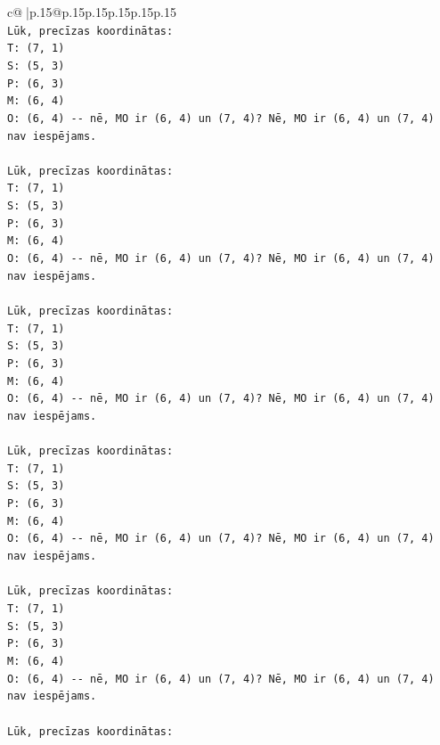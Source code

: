\documentclass{article}
\begin{document}
{\begin{supertabular}{c@{$\;$}|p{.15\linewidth}@{}p{.15\linewidth}p{.15\linewidth}p{.15\linewidth}p{.15\linewidth}p{.15\linewidth}}
{{{\\ 
\texttt{Lūk, precīzas koordinātas:} \\
\texttt{T: (7, 1)} \\
\texttt{S: (5, 3)} \\
\texttt{P: (6, 3)} \\
\texttt{M: (6, 4)} \\
\texttt{O: (6, 4) {-}{-} nē, MO ir (6, 4) un (7, 4)? Nē, MO ir (6, 4) un (7, 4) nav iespējams.} \\
\\ 
\texttt{Lūk, precīzas koordinātas:} \\
\texttt{T: (7, 1)} \\
\texttt{S: (5, 3)} \\
\texttt{P: (6, 3)} \\
\texttt{M: (6, 4)} \\
\texttt{O: (6, 4) {-}{-} nē, MO ir (6, 4) un (7, 4)? Nē, MO ir (6, 4) un (7, 4) nav iespējams.} \\
\\ 
\texttt{Lūk, precīzas koordinātas:} \\
\texttt{T: (7, 1)} \\
\texttt{S: (5, 3)} \\
\texttt{P: (6, 3)} \\
\texttt{M: (6, 4)} \\
\texttt{O: (6, 4) {-}{-} nē, MO ir (6, 4) un (7, 4)? Nē, MO ir (6, 4) un (7, 4) nav iespējams.} \\
\\ 
\texttt{Lūk, precīzas koordinātas:} \\
\texttt{T: (7, 1)} \\
\texttt{S: (5, 3)} \\
\texttt{P: (6, 3)} \\
\texttt{M: (6, 4)} \\
\texttt{O: (6, 4) {-}{-} nē, MO ir (6, 4) un (7, 4)? Nē, MO ir (6, 4) un (7, 4) nav iespējams.} \\
\\ 
\texttt{Lūk, precīzas koordinātas:} \\
\texttt{T: (7, 1)} \\
\texttt{S: (5, 3)} \\
\texttt{P: (6, 3)} \\
\texttt{M: (6, 4)} \\
\texttt{O: (6, 4) {-}{-} nē, MO ir (6, 4) un (7, 4)? Nē, MO ir (6, 4) un (7, 4) nav iespējams.} \\
\\ 
\texttt{Lūk, precīzas koordinātas:} \\
}}}
\end{supertabular}}
\end{document}

